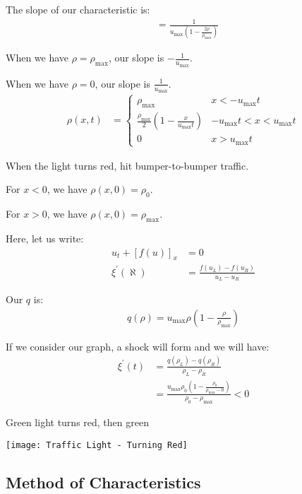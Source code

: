 \documentclass{article}
\begin{document}
The slope of our characteristic is:
%
\begin{align}
  & = \frac{1}{u_{\max} \left(1 - \frac{2 \rho}{\rho_{\max}}\right)}
\end{align}

When we have $\rho = \rho_{\max}$, our slope is $- \frac{1}{u_{\max}}$.

When we have $\rho = 0$, our slope is $\frac{1}{u_{\max}}$.
%
\begin{align}
  \rho(x, t) & =
  \begin{cases}
    \rho_{\max} & x < - u_{\max} t\\
    \frac{\rho_{\max}}{2} \left(1 - \frac{x}{u_{\max}t}\right)
    & -u_{\max} t < x < u_{\max} t\\
    0 & x > u_{\max} t
  \end{cases}
\end{align}

\ex When the light turns red, hit bumper-to-bumper traffic.

For $x < 0$, we have $\rho(x, 0) = \rho_0$.

For $x > 0$, we have $\rho(x, 0) = \rho_{\max}$.

Here, let us write:
%
\begin{align}
  u_t + [f(u)]_x & = 0\\
  \xi^\prime(\aleph) & = \frac{f(u_L) - f(u_R)}{u_L - u_R}
\end{align}

Our $q$ is:
%
\begin{align}
  q(\rho) = u_{\max} \rho\left(1 - \frac{\rho}{\rho_{\max}}\right)
\end{align}

If we consider our graph, a shock will form and we will have:
%
\begin{align}
  \xi^\prime(t) & = \frac{q(\rho_L) - q(\rho_R)}{\rho_L - \rho_R}\\
  & = \frac{u_{\max} \rho_0 \left( 1 - \frac{\rho_0}{\rho_{\max}
  - 0}\right)}{\rho_0 - \rho_{\max}} < 0
\end{align}


\ex Green light turns red, then green

\begin{center}
  \texttt{[image: Traffic Light - Turning Red]}
\end{center}

\subsection{Method of Characteristics}
\end{document}
